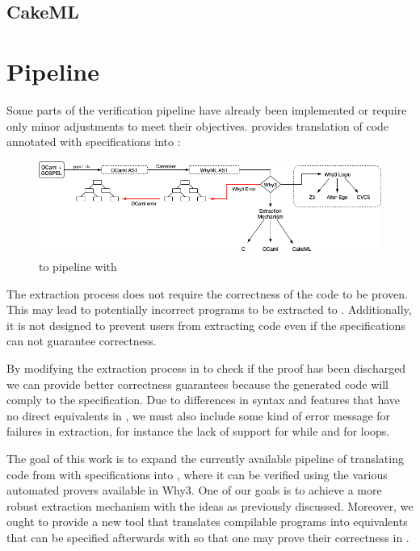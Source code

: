 \subsection{CakeML}
\label{sec:CakeML}

\section{Pipeline}
\label{sec:Pipeline}

Some parts of the verification pipeline have already been implemented or require only minor adjustments to meet their 
objectives. \cameleer provides translation of \ocaml code annotated with \gospel specifications into \whyml :

\begin{figure}[H]
    \centering
    \includegraphics[width=\linewidth]{images/Cameleer.png}
    \caption{\ocaml to \whyml pipeline with \cameleer}
    \label{fig:Cameleer_pipeline}
\end{figure}

The extraction process does not require the correctness of the code to be proven. This may lead to potentially incorrect \ocaml 
programs to be extracted to \cml. Additionally, it is not designed to prevent users from extracting code even if the \gospel 
specifications can not guarantee correctness.


By modifying the extraction process in \whythree to check if the proof has been discharged we can provide better correctness 
guarantees because the generated \cml code will comply to the specification. Due to differences in syntax and features that 
have no direct equivalents in \cml, we must also include some kind of error message for failures in extraction, for instance 
the lack of support for while and for loops.

The goal of this work is to expand the currently available pipeline of translating code from \ocaml with \gospel specifications 
into \whyml, where it can be verified using the various automated provers available in Why3. One of our goals is to achieve 
a more robust extraction mechanism with the ideas as previously discussed. Moreover, we ought to provide a new tool that 
translates compilable \cml programs into \ocaml equivalents that can be specified afterwards with \gospel so that one may prove 
their correctness in \cameleer.

